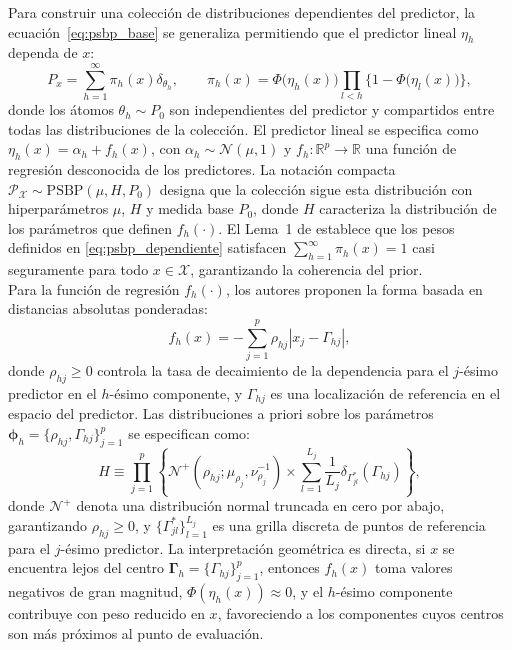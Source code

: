 Para construir una colección de distribuciones dependientes del predictor, la ecuación~\eqref{eq:psbp_base} se generaliza permitiendo que el predictor lineal $\eta_h$ dependa de $x$:
\begin{equation}\label{eq:psbp_dependiente}
    P_x = \sum_{h=1}^{\infty} \pi_h(x) \delta_{\theta_h},
    \qquad \pi_h(x) = \Phi\bigl(\eta_h(x)\bigr)
    \prod_{l < h}\bigl\{1 - \Phi\bigl(\eta_l(x)\bigr)\bigr\},
\end{equation}
donde los átomos $\theta_h \sim P_0$ son independientes del predictor y compartidos entre todas las distribuciones de la colección. El predictor lineal se especifica como $\eta_h(x) = \alpha_h + f_h(x)$, con $\alpha_h \sim \mathcal{N}(\mu, 1)$ y $f_h : \mathbb{R}^p \to \mathbb{R}$ una función de regresión desconocida de los predictores. La notación compacta $\mathcal{P}_{\mathcal{X}} \sim \mathrm{PSBP}(\mu, H, P_0)$ designa que la colección sigue esta distribución con hiperparámetros $\mu$, $H$ y medida base $P_0$, donde $H$ caracteriza la distribución de los parámetros que definen $f_h(\cdot)$. El Lema~1 de \citet{03_02_chung2009nonparametric} establece que los pesos definidos en \eqref{eq:psbp_dependiente} satisfacen $\sum_{h=1}^{\infty}\pi_h(x) = 1$ casi seguramente para todo $x \in \mathcal{X}$, garantizando la coherencia del prior.\\
 
Para la función de regresión $f_h(\cdot)$, los autores proponen la forma basada en distancias absolutas ponderadas:
\begin{equation}\label{eq:fh_kernel}
    f_h(x) = -\sum_{j=1}^{p} \rho_{hj} |x_j - \Gamma_{hj}|,
\end{equation}
donde $\rho_{hj} \geq 0$ controla la tasa de decaimiento de la dependencia para el $j$-ésimo predictor en el $h$-ésimo componente, y $\Gamma_{hj}$ es una localización de referencia en el espacio del predictor. Las distribuciones a priori sobre los parámetros $\boldsymbol{\phi}_h = \{\rho_{hj}, \Gamma_{hj}\}_{j=1}^{p}$ se especifican como:
\begin{equation}\label{eq:prior_phi}
    H \equiv \prod_{j=1}^{p} \left\{
        \mathcal{N}^+\!\left(\rho_{hj}; \mu_{\rho_j},
        \nu_{\rho_j}^{-1}\right)
        \times \sum_{l=1}^{L_j} \frac{1}{L_j}
        \delta_{\Gamma_{jl}^*}(\Gamma_{hj})
    \right\},
\end{equation}
donde $\mathcal{N}^+$ denota una distribución normal truncada en cero por abajo, garantizando $\rho_{hj} \geq 0$, y $\{\Gamma_{jl}^*\}_{l=1}^{L_j}$ es una grilla discreta de puntos de referencia para el $j$-ésimo predictor. La interpretación geométrica es directa, si $x$ se encuentra lejos del centro $\boldsymbol{\Gamma}_h = \{\Gamma_{hj}\}_{j=1}^{p}$, entonces $f_h(x)$ toma valores negativos de gran magnitud, $\Phi(\eta_h(x)) \approx 0$, y el $h$-ésimo componente contribuye con peso reducido en $x$, favoreciendo a los componentes cuyos centros son más próximos al punto de evaluación.
 
